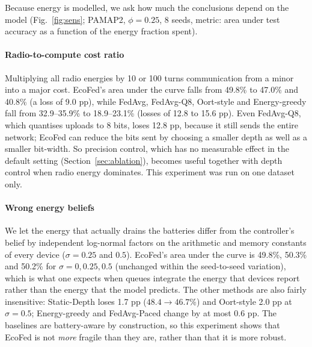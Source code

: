 Because energy is modelled, we ask how much the conclusions depend on the model (Fig.~\ref{fig:sens}; PAMAP2, $\phi=0.25$, 8 seeds, metric: area under test accuracy as a function of the energy fraction spent).

\paragraph{Radio-to-compute cost ratio}
Multiplying all radio energies by 10 or 100 turns communication from a minor into a major cost. EcoFed's area under the curve falls from 49.8\% to 47.0\% and 40.8\% (a loss of 9.0 pp), while FedAvg, FedAvg-Q8, Oort-style and Energy-greedy fall from 32.9--35.9\% to 18.9--23.1\% (losses of 12.8 to 15.6 pp). Even FedAvg-Q8, which quantises uploads to 8 bits, loses 12.8 pp, because it still sends the entire network; EcoFed can reduce the bits sent by choosing a smaller depth as well as a smaller bit-width. So precision control, which has no measurable effect in the default setting (Section~\ref{sec:ablation}), becomes useful together with depth control when radio energy dominates. This experiment was run on one dataset only.

\paragraph{Wrong energy beliefs}
We let the energy that actually drains the batteries differ from the controller's belief by independent log-normal factors on the arithmetic and memory constants of every device ($\sigma=0.25$ and $0.5$). EcoFed's area under the curve is 49.8\%, 50.3\% and 50.2\% for $\sigma=0,0.25,0.5$ (unchanged within the seed-to-seed variation), which is what one expects when queues integrate the energy that devices report rather than the energy that the model predicts. The other methods are also fairly insensitive: Static-Depth loses 1.7 pp ($48.4\to46.7$\%) and Oort-style 2.0 pp at $\sigma=0.5$; Energy-greedy and FedAvg-Paced change by at most 0.6 pp. The baselines are battery-aware by construction, so this experiment shows that EcoFed is not \emph{more} fragile than they are, rather than that it is more robust.

